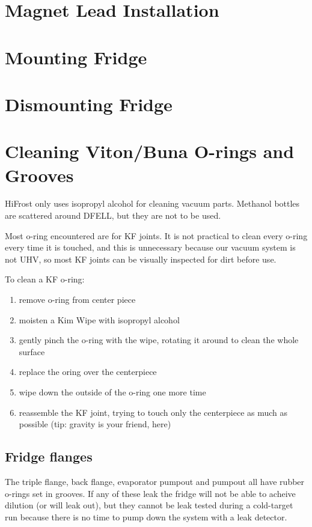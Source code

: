 \section{Magnet Lead Installation}

\section{Mounting Fridge}

\section{Dismounting Fridge}

\section{Cleaning Viton/Buna O-rings and Grooves}

HiFrost only uses isopropyl alcohol for cleaning vacuum parts.  Methanol bottles are scattered around DFELL, but they are not to be used.

Most o-ring encountered are for KF joints.  It is not practical to clean every o-ring every time it is touched, and this is unnecessary because our vacuum system is not UHV, so most KF joints can be visually inspected for dirt before use.



To clean a KF o-ring:
\begin{enumerate}
 \item remove o-ring from center piece
 \item moisten a Kim Wipe with isopropyl alcohol
 \item gently pinch the o-ring with the wipe, rotating it around to clean the whole surface
 \item replace the oring over the centerpiece
 \item wipe down the outside of the o-ring one more time
 \item reassemble the KF joint, trying to touch only the centerpiece as much as possible (tip: gravity is your friend, here)
\end{enumerate}


\subsection{Fridge flanges}
The triple flange, \het{} back flange, evaporator pumpout and \het{} pumpout all have rubber o-rings set in grooves.  If any of these leak the fridge will not be able to acheive dilution (or \het{} will leak out), but they cannot be leak tested during a cold-target run because there is no time to pump down the system with a leak detector.

